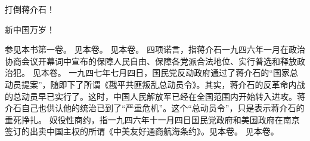 打倒蒋介石！

新中国万岁！


\begin{maonote}
参见本书第一卷。
见本卷。
见本卷。
四项诺言，指蒋介石一九四六年一月在政治协商会议开幕词中宣布的保障人民自由、保障各党派合法地位、实行普选和释放政治犯。
见本卷。
一九四七年七月四日，国民党反动政府通过了蒋介石的“国家总动员提案”，随即下了所谓《戡平共匪叛乱总动员令》。其实，蒋介石的反革命内战的总动员早已实行了。这时，中国人民解放军已经在全国范围内开始转入进攻。蒋介石自己也供认他的统治已到了“严重危机”。这个“总动员令”，只是表示蒋介石的垂死挣扎。
奴役性商约，指一九四六年十一月四日国民党政府和美国政府在南京签订的出卖中国主权的所谓《中美友好通商航海条约》。见本卷。
见本卷。
\end{maonote}
